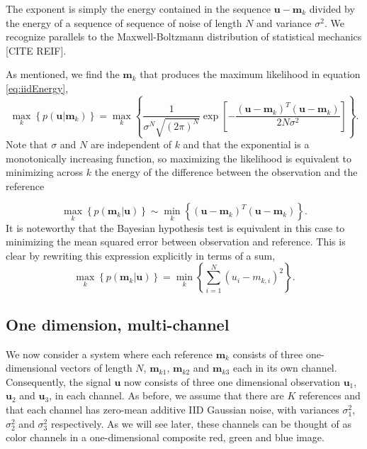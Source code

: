The exponent is simply the energy contained in the sequence $\mathbf{u}-\mathbf{m}_k$ divided by the
energy of a sequence of sequence of noise of length $N$ and variance $\sigma^2$. We recognize parallels to the Maxwell-Boltzmann distribution of statistical mechanics [CITE REIF].  

As mentioned, we find the $\mathbf{m}_k$ that produces the maximum likelihood in equation \ref{eq:iidEnergy},
\begin{equation}
\max_k   \left\{ p(\mathbf{u}|\mathbf{m}_k) \right\} =  \max_k  \left\{ \frac{1}{   \sigma^N\sqrt{ (2\pi)^N}  } \exp\left[ -\frac{(\mathbf{u}-\mathbf{m}_k)^T(\mathbf{u}-\mathbf{m}_k)} {2 N \sigma^2 } \right] \right\}. 
\end{equation}
Note that $\sigma$ and $N$ are independent of $k$ and that the exponential is a monotonically increasing function, so maximizing the likelihood is equivalent to minimizing across $k$ the energy of the difference between the observation and the reference

\begin{equation}
\max_k   \left\{ p(\mathbf{m}_k|\mathbf{u}) \right\} \sim \min_k  \left\{ (\mathbf{u}-\mathbf{m}_k)^T(\mathbf{u}-\mathbf{m}_k) \right\}. 
\end{equation}
It is noteworthy that the Bayesian hypothesis test is equivalent in this case to minimizing the mean squared error between observation and reference. This is clear by rewriting this expression explicitly in terms of a sum,
\begin{equation}
\max_k   \left\{ p(\mathbf{m}_k|\mathbf{u}) \right\} =  \min_k  \left\{ \sum_{i=1}^N  (u_i-m_{k,i})^2   \right\}. 
\end{equation}

\subsection{One dimension, multi-channel}\label{sec:simpleModel}
We now consider a system where each reference $\mathbf{m}_k$ consists of three one-dimensional vectors of length $N$, $\mathbf{m}_{k1}$, $\mathbf{m}_{k2}$ and $\mathbf{m}_{k3}$ each in its own channel. Consequently, the signal $\mathbf{u}$ now consists of three one dimensional observation $\mathbf{u}_1$, $\mathbf{u}_2$ and $\mathbf{u}_3$, in each channel. As before, we assume that there are $K$ references and that each channel has zero-mean additive IID Gaussian noise, with variances $\sigma_1^2$, $\sigma_2^2$ and $\sigma_3^2$ respectively. As we will see later, these channels can be thought of as color channels in a one-dimensional composite red, green and blue image. 

